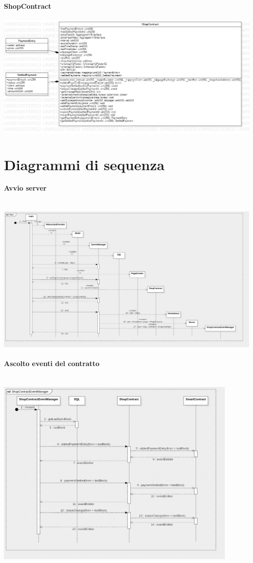 \documentclass[a4paper, 12pt]{article}
\begin{document}
\paragraph{ShopContract}
\includegraphics[width=1.0\textwidth]{contract}
\clearpage
\section{Diagrammi di sequenza}
\paragraph{Avvio server}\\
\includegraphics[width=1.0\textwidth]{main}

\paragraph{Ascolto eventi del contratto}\\
\includegraphics[width=0.9\textwidth]{event}
\end{document}
